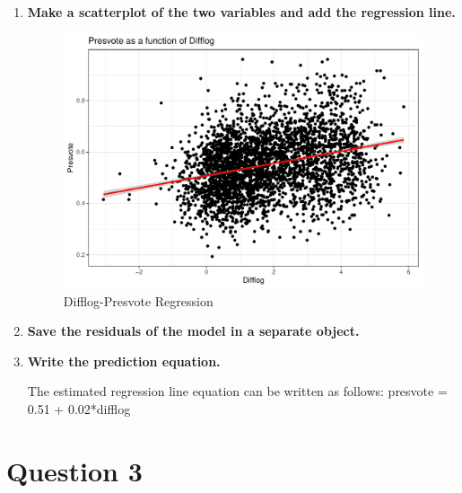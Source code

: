 \documentclass[12pt,letterpaper]{article}
\begin{document}
\begin{enumerate}
		
		
		\item \textbf{Make a scatterplot of the two variables and add the regression line. }	\vspace{.25cm}
		
		
		\vspace{.1cm}
		
		\begin{figure}[!htbp]\centering
			\caption{\footnotesize Difflog-Presvote Regression}
			\label{fig:plot_5}
			\includegraphics[width=.85\textwidth]{Q2graph.pdf}
		\end{figure}
		
		\item \textbf{Save the residuals of the model in a separate object.}	\vspace{.25cm}
		
		
		\vspace{.25cm}
		
		\item \textbf{Write the prediction equation.}
		
		\noindent The estimated regression line equation can be written as follows: 
		\newline 
		presvote = 0.51 + 0.02*difflog 
		
	\end{enumerate}
	
	\newpage	
	\section*{Question 3}
	
\end{document}
